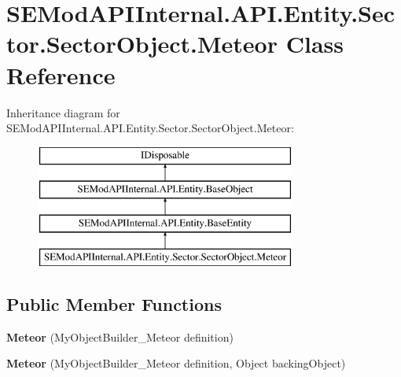 \hypertarget{class_s_e_mod_a_p_i_internal_1_1_a_p_i_1_1_entity_1_1_sector_1_1_sector_object_1_1_meteor}{}\section{S\+E\+Mod\+A\+P\+I\+Internal.\+A\+P\+I.\+Entity.\+Sector.\+Sector\+Object.\+Meteor Class Reference}
\label{class_s_e_mod_a_p_i_internal_1_1_a_p_i_1_1_entity_1_1_sector_1_1_sector_object_1_1_meteor}
Inheritance diagram for S\+E\+Mod\+A\+P\+I\+Internal.\+A\+P\+I.\+Entity.\+Sector.\+Sector\+Object.\+Meteor\+:\begin{figure}[H]
\begin{center}
\leavevmode
\includegraphics[height=4.000000cm]{class_s_e_mod_a_p_i_internal_1_1_a_p_i_1_1_entity_1_1_sector_1_1_sector_object_1_1_meteor}
\end{center}
\end{figure}
\subsection*{Public Member Functions}
\begin{DoxyCompactItemize}
\item 
\hypertarget{class_s_e_mod_a_p_i_internal_1_1_a_p_i_1_1_entity_1_1_sector_1_1_sector_object_1_1_meteor_ad3ee16dbf2ba25d477d537b636ae8c9f}{}{\bfseries Meteor} (My\+Object\+Builder\+\_\+\+Meteor definition)\label{class_s_e_mod_a_p_i_internal_1_1_a_p_i_1_1_entity_1_1_sector_1_1_sector_object_1_1_meteor_ad3ee16dbf2ba25d477d537b636ae8c9f}

\item 
\hypertarget{class_s_e_mod_a_p_i_internal_1_1_a_p_i_1_1_entity_1_1_sector_1_1_sector_object_1_1_meteor_af2d5012c5c9f407cfcf3f5db94bbd657}{}{\bfseries Meteor} (My\+Object\+Builder\+\_\+\+Meteor definition, Object backing\+Object)\label{class_s_e_mod_a_p_i_internal_1_1_a_p_i_1_1_entity_1_1_sector_1_1_sector_object_1_1_meteor_af2d5012c5c9f407cfcf3f5db94bbd657}

\end{DoxyCompactItemize}
